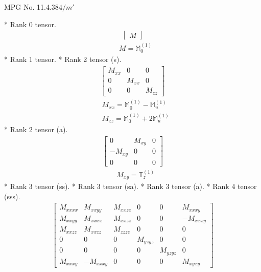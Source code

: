 \documentclass[fleqn,8pt,landscape]{jsarticle}
\begin{document}
\setcounter{MaxMatrixCols}{32}

\renewcommand{\tablename}{Table~}
\renewcommand{\figurename}{Figure~}
\begin{center}
\LARGE
MPG No. 11.4.38\quad$4/m'$
\end{center}
* Rank 0 tensor.
\begin{align*}
\begin{bmatrix} M \end{bmatrix}
\end{align*}
\begin{align*}
& M = \mathbb{M}_{0}^{(1)}
\end{align*}
* Rank 1 tensor.
* Rank 2 tensor (s).
\begin{align*}
\begin{bmatrix} M_{xx} & 0 & 0 \\ 0 & M_{xx} & 0 \\ 0 & 0 & M_{zz} \end{bmatrix}
\end{align*}
\begin{align*}
& M_{xx} = \mathbb{M}_{0}^{(1)} - \mathbb{M}_{u}^{(1)} \\
& M_{zz} = \mathbb{M}_{0}^{(1)} + 2 \mathbb{M}_{u}^{(1)}
\end{align*}
* Rank 2 tensor (a).
\begin{align*}
\begin{bmatrix} 0 & M_{xy} & 0 \\ - M_{xy} & 0 & 0 \\ 0 & 0 & 0 \end{bmatrix}
\end{align*}
\begin{align*}
& M_{xy} = \mathbb{T}_{z}^{(1)}
\end{align*}
* Rank 3 tensor (ss).
* Rank 3 tensor (sa).
* Rank 3 tensor (a).
* Rank 4 tensor (sss).
\begin{align*}
\begin{bmatrix} M_{xxxx} & M_{xxyy} & M_{xxzz} & 0 & 0 & M_{xxxy} \\ M_{xxyy} & M_{xxxx} & M_{xxzz} & 0 & 0 & - M_{xxxy} \\ M_{xxzz} & M_{xxzz} & M_{zzzz} & 0 & 0 & 0 \\ 0 & 0 & 0 & M_{yzyz} & 0 & 0 \\ 0 & 0 & 0 & 0 & M_{yzyz} & 0 \\ M_{xxxy} & - M_{xxxy} & 0 & 0 & 0 & M_{xyxy} \end{bmatrix}
\end{align*}
\end{document}
